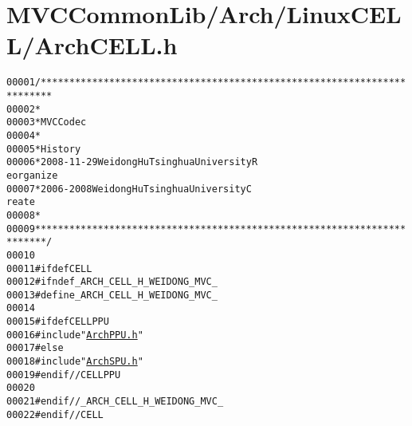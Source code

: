 \hypertarget{_arch_c_e_l_l_8h_source}{
\section{MVCCommonLib/Arch/LinuxCELL/ArchCELL.h}
}


\begin{footnotesize}\begin{alltt}
00001 \textcolor{comment}{/************************************************************************}
00002 \textcolor{comment}{ *}
00003 \textcolor{comment}{ * MVC Codec}
00004 \textcolor{comment}{ * }
00005 \textcolor{comment}{ * History}
00006 \textcolor{comment}{ * 2008-11-29           Weidong Hu              Tsinghua University             R
      eorganize}
00007 \textcolor{comment}{ * 2006-2008            Weidong Hu              Tsinghua University             C
      reate}
00008 \textcolor{comment}{ * }
00009 \textcolor{comment}{ ************************************************************************/}
00010 
00011 \textcolor{preprocessor}{#ifdef CELL}
00012 \textcolor{preprocessor}{}\textcolor{preprocessor}{#ifndef \_ARCH\_CELL\_H\_WEIDONG\_MVC\_}
00013 \textcolor{preprocessor}{}\textcolor{preprocessor}{#define \_ARCH\_CELL\_H\_WEIDONG\_MVC\_}
00014 \textcolor{preprocessor}{}
00015 \textcolor{preprocessor}{#ifdef CELLPPU}
00016 \textcolor{preprocessor}{}\textcolor{preprocessor}{#include "\hyperlink{_arch_p_p_u_8h}{ArchPPU.h}"}
00017 \textcolor{preprocessor}{#else}
00018 \textcolor{preprocessor}{}\textcolor{preprocessor}{#include "\hyperlink{_arch_s_p_u_8h}{ArchSPU.h}"}
00019 \textcolor{preprocessor}{#endif //CELLPPU}
00020 \textcolor{preprocessor}{}
00021 \textcolor{preprocessor}{#endif //\_ARCH\_CELL\_H\_WEIDONG\_MVC\_}
00022 \textcolor{preprocessor}{}\textcolor{preprocessor}{#endif //CELL}
\end{alltt}\end{footnotesize}

